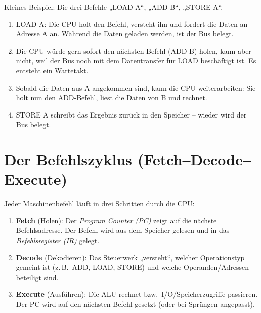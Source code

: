 \documentclass[../skript/main.tex]{subfiles}
\begin{document}
Kleines Beispiel: Die drei Befehle „LOAD A“, „ADD B“, „STORE A“.

\begin{enumerate}
	\item LOAD A: Die CPU holt den Befehl, versteht ihn und fordert die Daten an Adresse A an. Während die Daten geladen werden, ist der Bus belegt.
	\item Die CPU würde gern sofort den nächsten Befehl (ADD B) holen, kann aber nicht, weil der Bus noch mit dem Datentransfer für LOAD beschäftigt ist. Es entsteht ein Wartetakt.
	\item Sobald die Daten aus A angekommen sind, kann die CPU weiterarbeiten: Sie holt nun den ADD-Befehl, liest die Daten von B und rechnet.
	\item STORE A schreibt das Ergebnis zurück in den Speicher – wieder wird der Bus belegt.
\end{enumerate}






\section{Der Befehlszyklus (Fetch–Decode–Execute)}
Jeder Maschinenbefehl läuft in drei Schritten durch die CPU:
\begin{enumerate}
	\item \textbf{Fetch} (Holen): Der \emph{Program Counter (PC)} zeigt auf die nächste Befehlsadresse.
	Der Befehl wird aus dem Speicher gelesen und in das \emph{Befehlsregister (IR)} gelegt.
	\item \textbf{Decode} (Dekodieren): Das Steuerwerk „versteht“, welcher Operationstyp gemeint ist
	(z.\,B.\ ADD, LOAD, STORE) und welche Operanden/Adressen beteiligt sind.
	\item \textbf{Execute} (Ausführen): Die ALU rechnet bzw.\ I/O/Speicherzugriffe passieren.
	Der PC wird auf den nächsten Befehl gesetzt (oder bei Sprüngen angepasst).
\end{enumerate}
\end{document}
